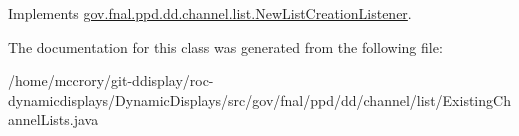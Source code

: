 Implements \hyperlink{interfacegov_1_1fnal_1_1ppd_1_1dd_1_1channel_1_1list_1_1NewListCreationListener_a453407f350d9eacded942c7336dd97c5}{gov.\-fnal.\-ppd.\-dd.\-channel.\-list.\-New\-List\-Creation\-Listener}.



The documentation for this class was generated from the following file\-:\begin{DoxyCompactItemize}
\item 
/home/mccrory/git-\/ddisplay/roc-\/dynamicdisplays/\-Dynamic\-Displays/src/gov/fnal/ppd/dd/channel/list/Existing\-Channel\-Lists.\-java\end{DoxyCompactItemize}
